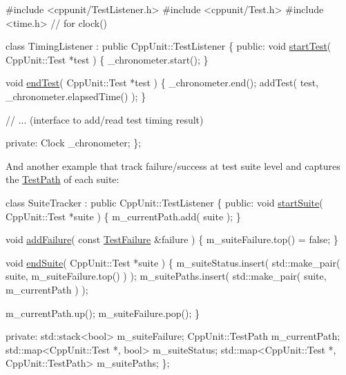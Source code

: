 \begin{DoxyCode}
\textcolor{preprocessor}{#include <cppunit/TestListener.h>}
\textcolor{preprocessor}{#include <cppunit/Test.h>}
\textcolor{preprocessor}{#include <time.h>}    \textcolor{comment}{// for clock()}

\textcolor{keyword}{class }TimingListener : \textcolor{keyword}{public} CppUnit::TestListener
\{
\textcolor{keyword}{public}:
  \textcolor{keywordtype}{void} \hyperlink{class_test_listener_a5546d4420e7412234915113b1ea5ad77}{startTest}( CppUnit::Test *test )
  \{
    \_chronometer.start();
  \}
 
  \textcolor{keywordtype}{void} \hyperlink{class_test_listener_ae8ccd0f55dd9aa7eafded05ba14f9ac6}{endTest}( CppUnit::Test *test )
  \{
    \_chronometer.end();
    addTest( test, \_chronometer.elapsedTime() );
  \}

  \textcolor{comment}{// ... (interface to add/read test timing result)}

\textcolor{keyword}{private}:
  Clock \_chronometer;
\};
\end{DoxyCode}


And another example that track failure/success at test suite level and captures the \hyperlink{class_test_path}{Test\-Path} of each suite\-: 
\begin{DoxyCode}
\textcolor{keyword}{class }SuiteTracker : \textcolor{keyword}{public} CppUnit::TestListener
\{
\textcolor{keyword}{public}:
  \textcolor{keywordtype}{void} \hyperlink{class_test_listener_a2360ebfccfa39f75bdc43948d5d1d2e7}{startSuite}( CppUnit::Test *suite )
  \{
    m\_currentPath.add( suite );
  \}
  
  \textcolor{keywordtype}{void} \hyperlink{class_test_listener_a103216a5814c907f7b752b969477e765}{addFailure}( \textcolor{keyword}{const} \hyperlink{class_test_failure}{TestFailure} &failure )
  \{
    m\_suiteFailure.top() = \textcolor{keyword}{false};
  \}

  \textcolor{keywordtype}{void} \hyperlink{class_test_listener_ad49e5589681732a1faff8fca5cbe61f5}{endSuite}( CppUnit::Test *suite )
  \{
    m\_suiteStatus.insert( std::make\_pair( suite, m\_suiteFailure.top() ) );
    m\_suitePaths.insert( std::make\_pair( suite, m\_currentPath ) );

    m\_currentPath.up();
    m\_suiteFailure.pop();
  \}

\textcolor{keyword}{private}:
  std::stack<bool> m\_suiteFailure;
  CppUnit::TestPath m\_currentPath;
  std::map<CppUnit::Test *, bool> m\_suiteStatus;
  std::map<CppUnit::Test *, CppUnit::TestPath> m\_suitePaths;
\};
\end{DoxyCode}


